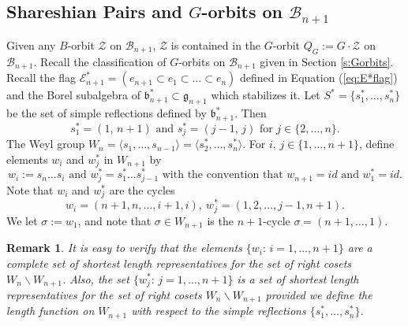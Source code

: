 \documentclass[12pt]{amsart}
\numberwithin{equation}{section}
\newtheorem{rem}[thm]{Remark}
\newcommand{\cZ}{{\mathcal Z}}
\newcommand{\Wn}{{W}_n}
\newcommand{\cW}{{ W}}
\newcommand{\fg}{\mbox{${\mathfrak g}$}}
\newcommand{\fb}{\mbox{${\mathfrak b}$}}
\newcommand{\B}{\mathcal{B}}
\begin{document}
 \subsection{Shareshian Pairs and $G$-orbits on $\B_{n+1}$}
 Given any $B$-orbit $\cZ$ on $\B_{n+1}$, $\cZ$ is contained in the $G$-orbit $Q_{G}:=G\cdot \cZ$ on $\B_{n+1}$.  Recall the classification of 
 $G$-orbits on $\B_{n+1}$ given in Section \ref{s:Gorbits}.  Recall the flag 
 $\mathcal{E}^{*}_{n+1}=(e_{n+1}\subset e_{1}\subset\dots\subset e_{n})$ defined in Equation (\ref{eq:E*flag}) and the Borel subalgebra of $\fb_{n+1}^{*}\subset\fg_{n+1}$ which stabilizes it.  Let $S^{*}=\{s_{1}^{*}, \dots, s_{n}^{*}\}$ be the set of simple reflections defined by $\fb^{*}_{n+1}$.  Then 
 \begin{equation}\label{eq:starreflections}
 s_{1}^{*}=(1,\, n+1)\mbox{ and } s_{j}^{*}=(j-1,\, j)\mbox{ for } j\in\{2,\dots, n\}.  
\end{equation}
The Weyl group $\Wn =\langle s_{1},\dots, s_{n-1}\rangle=\langle s_{2}^{*}, \dots, s_{n}^{*}\rangle.$  
For $i,\, j\in\{1,\dots, n+1\}$, define elements $w_{i}$ and $w_{j}^{*}$ in $W_{n+1}$ by 
\begin{equation}\label{eq:specialWelts}
w_{i}:=s_{n}\dots s_{i}\mbox{ and } w_{j}^{*}=s_{1}^{*}\dots s_{j-1}^{*} \mbox{ with the convention that } w_{n+1}=id\mbox{ and } w_{1}^{*}=id.  
\end{equation}
Note that $w_{i}$ and $w_j^{*}$ are the cycles
\begin{equation}\label{eq:specialexplicit}
w_{i}=(n+1, n, \dots, i+1, i), \ w_j^{*}=(1,2,\dots, j-1, n+1).
\end{equation}
We let $\sigma:=w_{1}$, and note that $\sigma\in W_{n+1}$ is the $n+1$-cycle 
$\sigma=(n+1,\dots, 1)$.  


\begin{rem}\label{r:shortestreps}
It is easy to verify that the elements $\{w_{i}:\, i=1,\dots, n+1\}$ are a complete set of shortest length
representatives for the set of right cosets $\Wn\backslash {\cW}_{n+1}$.  Also, the 
set $\{w_{j}^{*}:\, j=1,\dots, n+1\}$ is a set of shortest length representatives for the set of right cosets 
 $\Wn\backslash {\cW}_{n+1}$ provided we define the length function on ${\cW}_{n+1}$  with respect to the simple reflections 
$\{s_{1}^{*}, \dots, s_{n}^{*}\}$.
\end{rem}
\end{document}
